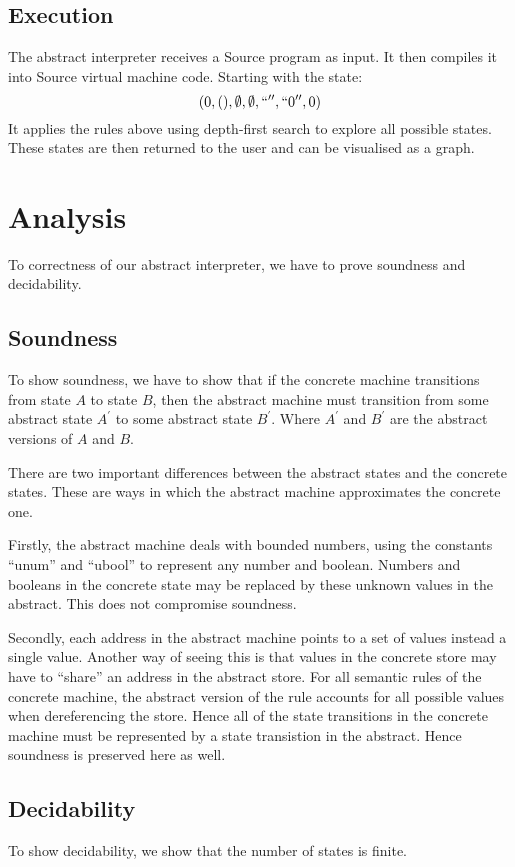 \documentclass[12pt]{article}
\begin{document}
\subsection{Execution}
The abstract interpreter receives a Source program as input. It then compiles it into Source virtual machine code. Starting with the state:
$$(0,(),\emptyset,\emptyset,``'',``0'',0)$$
It applies the rules above using depth-first search to explore all possible states. These states are then returned to the user and can be visualised as a graph.

\section{Analysis}
To correctness of our abstract interpreter, we have to prove soundness and decidability.

\subsection{Soundness}
To show soundness, we have to show that if the concrete machine transitions from state $A$ to state $B$, then the abstract machine must transition from some abstract state $A^{\prime}$ to some abstract state $B^{\prime}$. Where $A^{\prime}$ and $B^{\prime}$ are the abstract versions of $A$ and $B$.

There are two important differences between the abstract states and the concrete states. These are ways in which the abstract machine approximates the concrete one.

Firstly, the abstract machine deals with bounded numbers, using the constants ``unum'' and ``ubool'' to represent any number and boolean. Numbers and booleans in the concrete state may be replaced by these unknown values in the abstract. This does not compromise soundness.

Secondly, each address in the abstract machine points to a set of values instead a single value. Another way of seeing this is that values in the concrete store may have to ``share'' an address in the abstract store. For all semantic rules of the concrete machine, the abstract version of the rule accounts for all possible values when dereferencing the store. Hence all of the state transitions in the concrete machine must be represented by a state transistion in the abstract. Hence soundness is preserved here as well.

\subsection{Decidability}
To show decidability, we show that the number of states is finite. 
\end{document}
